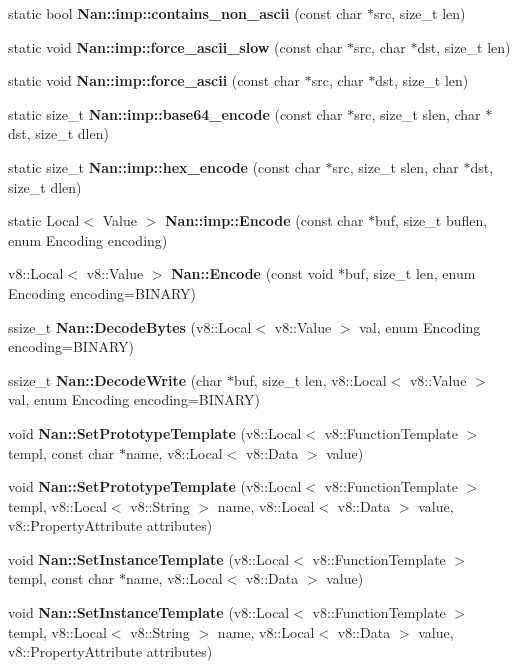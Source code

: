 \begin{DoxyCompactItemize}
\item 
static bool \textbf{ Nan\+::imp\+::contains\+\_\+non\+\_\+ascii} (const char $\ast$src, size\+\_\+t len)
\item 
static void \textbf{ Nan\+::imp\+::force\+\_\+ascii\+\_\+slow} (const char $\ast$src, char $\ast$dst, size\+\_\+t len)
\item 
static void \textbf{ Nan\+::imp\+::force\+\_\+ascii} (const char $\ast$src, char $\ast$dst, size\+\_\+t len)
\item 
static size\+\_\+t \textbf{ Nan\+::imp\+::base64\+\_\+encode} (const char $\ast$src, size\+\_\+t slen, char $\ast$dst, size\+\_\+t dlen)
\item 
static size\+\_\+t \textbf{ Nan\+::imp\+::hex\+\_\+encode} (const char $\ast$src, size\+\_\+t slen, char $\ast$dst, size\+\_\+t dlen)
\item 
static Local$<$ Value $>$ \textbf{ Nan\+::imp\+::\+Encode} (const char $\ast$buf, size\+\_\+t buflen, enum Encoding encoding)
\item 
v8\+::\+Local$<$ v8\+::\+Value $>$ \textbf{ Nan\+::\+Encode} (const void $\ast$buf, size\+\_\+t len, enum Encoding encoding=B\+I\+N\+A\+RY)
\item 
ssize\+\_\+t \textbf{ Nan\+::\+Decode\+Bytes} (v8\+::\+Local$<$ v8\+::\+Value $>$ val, enum Encoding encoding=B\+I\+N\+A\+RY)
\item 
ssize\+\_\+t \textbf{ Nan\+::\+Decode\+Write} (char $\ast$buf, size\+\_\+t len, v8\+::\+Local$<$ v8\+::\+Value $>$ val, enum Encoding encoding=B\+I\+N\+A\+RY)
\item 
void \textbf{ Nan\+::\+Set\+Prototype\+Template} (v8\+::\+Local$<$ v8\+::\+Function\+Template $>$ templ, const char $\ast$name, v8\+::\+Local$<$ v8\+::\+Data $>$ value)
\item 
void \textbf{ Nan\+::\+Set\+Prototype\+Template} (v8\+::\+Local$<$ v8\+::\+Function\+Template $>$ templ, v8\+::\+Local$<$ v8\+::\+String $>$ name, v8\+::\+Local$<$ v8\+::\+Data $>$ value, v8\+::\+Property\+Attribute attributes)
\item 
void \textbf{ Nan\+::\+Set\+Instance\+Template} (v8\+::\+Local$<$ v8\+::\+Function\+Template $>$ templ, const char $\ast$name, v8\+::\+Local$<$ v8\+::\+Data $>$ value)
\item 
void \textbf{ Nan\+::\+Set\+Instance\+Template} (v8\+::\+Local$<$ v8\+::\+Function\+Template $>$ templ, v8\+::\+Local$<$ v8\+::\+String $>$ name, v8\+::\+Local$<$ v8\+::\+Data $>$ value, v8\+::\+Property\+Attribute attributes)
\item 

\end{DoxyCompactItemize}
